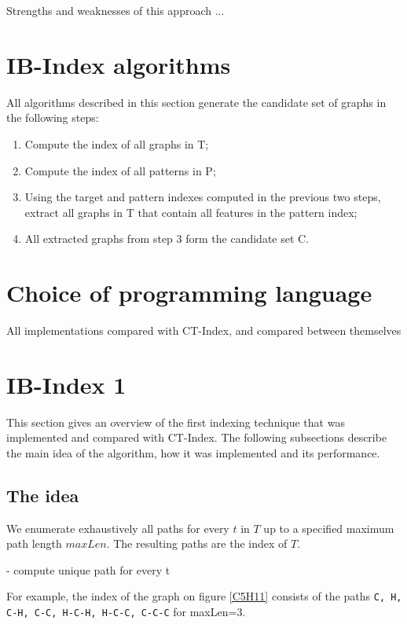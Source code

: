 \documentclass{l4proj}
\theoremstyle{definition}
\begin{document}
    Strengths and weaknesses of this approach ...
    
    \section{IB-Index algorithms}
    All algorithms described in this section generate the candidate set of graphs in the following steps:
    
    \begin{enumerate}
        \label{indexSteps}
        \item Compute the index of all graphs in T;
        \item Compute the index of all patterns in P;
        \item Using the target and pattern indexes computed in the previous two steps, extract all graphs in T that contain all features in the pattern index;
        \item All extracted graphs from step 3 form the candidate set C.
	\end{enumerate}
    
\section{Choice of programming language}
    
    All implementations compared with CT-Index, and compared between themselves
    
\section{IB-Index 1}
    This section gives an overview of the first indexing technique that was implemented and compared with CT-Index. The following subsections describe the main idea of the algorithm, how it was implemented and its performance.
    \subsection{The idea}
        
        We enumerate exhaustively all paths for every $t$ in $T$ up to a specified maximum path length $maxLen$. The resulting paths are the index of $T$.
        
        - compute unique path for every t
        
        For example, the index of the graph on figure \ref{C5H11} consists of the paths \texttt{C, H, C-H, C-C, H-C-H, H-C-C, C-C-C} for maxLen=3.
        
\end{document}
